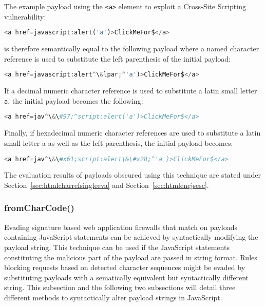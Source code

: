 The example payload using the \verb|<a>| element to exploit a Cross-Site Scripting vulnerability:

\begin{lstlisting}[style=basicStyle, language=Python, escapeinside=\^\^]
<a href=javascript:alert('a')>ClickMeFor$</a>
\end{lstlisting}

is therefore semantically equal to the following payload where a named character reference is used to substitute the left parenthesis of the initial payload:

\begin{lstlisting}[style=basicStyle, language=Python, escapeinside=\^\^]
<a href=javascript:alert^\&lpar;^'a')>ClickMeFor$</a>
\end{lstlisting}

If a decimal numeric character reference is used to substitute a latin small letter \verb|a|, the initial payload becomes the following:

\begin{lstlisting}[style=basicStyle, language=Python, escapeinside=\^\^]
<a href=jav^\&\#97;^script:alert('a')>ClickMeFor$</a>
\end{lstlisting}

Finally, if hexadecimal numeric character references are used to substitute a latin small letter a as well as the left parenthesis, the initial payload becomes:

\begin{lstlisting}[style=basicStyle, language=Python, escapeinside=\^\^]
<a href=jav^\&\#x61;script:alert\&\#x28;^'a')>ClickMeFor$</a>
\end{lstlisting}

The evaluation results of payloads obscured using this technique are stated under Section~\ref{sec:htmlcharrefsingleeva} and Section~\ref{sec:htmlencjsesc}.

\subsubsection{fromCharCode()}
\label{sec:fromcharcodetech}
Evading signature based web application firewalls that match on payloads containing JavaScript statements can be achieved by syntactically modifying the payload string. This technique can be used if the JavaScript statements constituting the malicious part of the payload are passed in string format.
Rules blocking requests based on detected character sequences might be evaded by substituting payloads with a sematically equivalent but syntactically different string. This subsection and the following two subsections will detail three different methods to syntactically alter payload strings in JavaScript. \\

